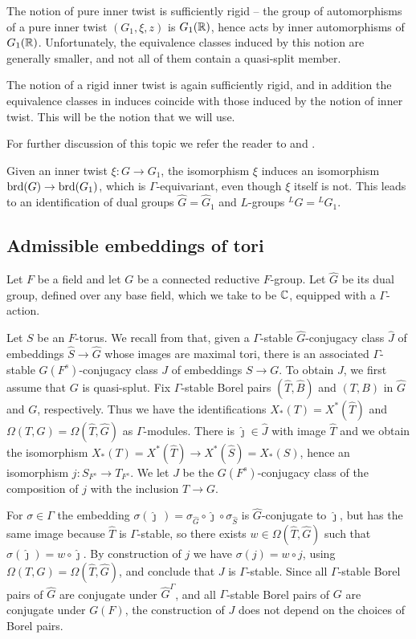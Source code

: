 \documentclass{article}
\theoremstyle{definition}
\numberwithin{equation}{section}
\renewcommand{\-}{\hyp{}}
\begin{document}
The notion of pure inner twist is sufficiently rigid -- the group of automorphisms of a pure inner twist $(G_1,\xi,z)$ is $G_1(\mathbb{R})$, hence acts by inner automorphisms of $G_1(\mathbb{R})$. Unfortunately, the equivalence classes induced by this notion are generally smaller, and not all of them contain a quasi-split member.

The notion of a rigid inner twist is again sufficiently rigid, and in addition the equivalence classes in induces coincide with those induced by the notion of inner twist. This will be the notion that we will use.

For further discussion of this topic we refer the reader to \cite{Vog93} and \cite{KalSimons}.

Given an inner twist $\xi : G \to G_1$, the isomorphism $\xi$ induces an isomorphism $\textrm{brd}(G) \to \textrm{brd}(G_1)$, which is $\Gamma$-equivariant, even though $\xi$ itself is not. This leads to an identification of dual groups $\hat G = \hat G_1$ and $L$\-groups $^LG = {^LG}_1$.


\subsection{Admissible embeddings of tori} \label{sub:adm}

Let $F$ be a field and let $G$ be a connected reductive $F$-group. Let $\hat G$ be its dual group, defined over any base field, which we take to be $\mathbb{C}$, equipped with a $\Gamma$-action.

Let $S$ be an $F$-torus. We recall from \cite[\S5.1]{KalRSP} that, given a $\Gamma$-stable $\hat G$-conjugacy class $\hat J$ of embeddings $\hat S \to \hat G$ whose images are maximal tori, there is an associated $\Gamma$-stable $G(F^s)$-conjugacy class $J$ of embeddings $S \to G$. To obtain $J$, we first assume that $G$ is quasi-splut. Fix $\Gamma$-stable Borel pairs $(\hat T,\hat B)$ and $(T,B)$ in $\hat G$ and $G$, respectively. Thus we have the identifications $X_*(T)=X^*(\hat T)$ and $\Omega(T,G)=\Omega(\hat T,\hat G)$ as $\Gamma$-modules. There is $\hat\jmath \in \hat J$ with image $\hat T$ and we obtain the isomorphism $X_*(T)=X^*(\hat T) \to X^*(\hat S)=X_*(S)$, hence an isomorphism $j : S_{F^s} \to T_{F^s}$. We let $J$ be the $G(F^s)$-conjugacy class of the composition of $j$ with the inclusion $T \to G$.

For $\sigma \in \Gamma$ the embedding $\sigma(\hat\jmath\,)=\sigma_{\hat G}\circ \hat\jmath \circ \sigma_{\hat S}$ is $\hat G$-conjugate to $\hat\jmath$, but has the same image because $\hat T$ is $\Gamma$-stable, so there exists $w \in \Omega(\hat T,\hat G)$ such that $\sigma(\hat\jmath)=w\circ\hat\jmath$. By construction of $j$ we have $\sigma(j)=w\circ j$, using $\Omega(T,G)=\Omega(\hat T,\hat G)$, and conclude that $J$ is $\Gamma$-stable. Since all $\Gamma$-stable Borel pairs of $\hat G$ are conjugate under $\hat G^\Gamma$, and all $\Gamma$-stable Borel pairs of $G$ are conjugate under $G(F)$, the construction of $J$ does not depend on the choices of Borel pairs.
\end{document}
